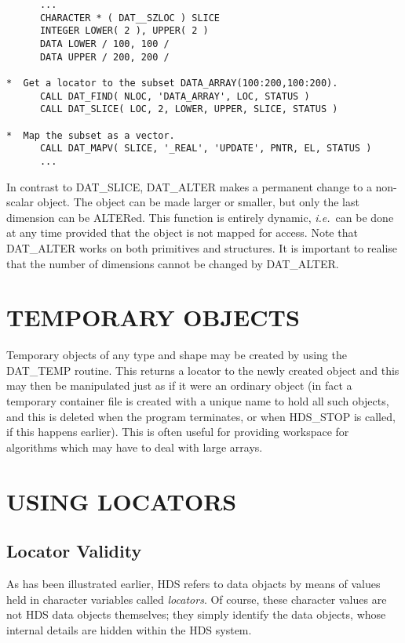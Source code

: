 \small
\begin{verbatim}
      ...
      CHARACTER * ( DAT__SZLOC ) SLICE
      INTEGER LOWER( 2 ), UPPER( 2 )
      DATA LOWER / 100, 100 /
      DATA UPPER / 200, 200 /

*  Get a locator to the subset DATA_ARRAY(100:200,100:200).
      CALL DAT_FIND( NLOC, 'DATA_ARRAY', LOC, STATUS )
      CALL DAT_SLICE( LOC, 2, LOWER, UPPER, SLICE, STATUS )

*  Map the subset as a vector.
      CALL DAT_MAPV( SLICE, '_REAL', 'UPDATE', PNTR, EL, STATUS )
      ...
\end{verbatim}
\normalsize

In contrast to DAT\_SLICE, DAT\_ALTER makes a permanent change to a
non-scalar object. The object can be made larger or smaller, but only the last
dimension can be ALTERed. This function is entirely dynamic, {\em i.e.}\ can be
done at any time provided that the object is not mapped for access. Note that
DAT\_ALTER works on both primitives and structures. It is important to
realise that the number of dimensions cannot be changed by DAT\_ALTER. 

\section{TEMPORARY OBJECTS}
Temporary objects of any type and shape may be created by using the 
DAT\_TEMP routine. This returns a locator to the newly created object and this
may then be manipulated just as if it were an ordinary object (in fact a
temporary container file is created with a unique name to hold all such objects,
and this is deleted when the program terminates, or when HDS\_STOP is
called, if this happens earlier). This is often useful for providing workspace
for algorithms which may have to deal with large arrays. 

\section{USING LOCATORS}
\label{sect:locators}

\subsection{Locator Validity}
As has been illustrated earlier, HDS refers to data objacts by means of values
held in character variables called {\em locators}.  Of course, these character
values are not HDS data objects themselves; they simply identify the data
objects, whose internal details are hidden within the HDS system.

